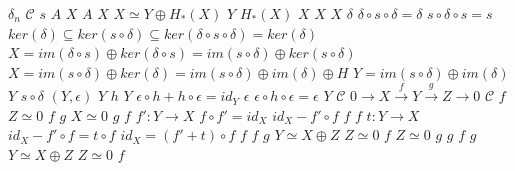 \documentclass{article}
\begin{document}
$\delta_n$
$\mathcal{C}$
$s$
$A$
$X$
$A$
$X$
$X \simeq Y \oplus H_*(X)$
$Y$
$H_*(X)$
$X$
$X$
$X$
$\delta$
$\delta \circ s \circ \delta=\delta$
$s \circ \delta \circ s=s$
$ker(\delta) \subseteq ker(s \circ \delta) \subseteq ker(\delta \circ s \circ \delta) =ker(\delta)$
$X=im(\delta \circ s) \oplus ker(\delta \circ s)=im(s \circ \delta) \oplus ker(s \circ \delta)$
$X=im(s \circ \delta) \oplus ker(\delta)=im(s \circ \delta) \oplus im(\delta) \oplus H$
$Y=im(s \circ \delta) \oplus im(\delta)$
$Y$
$s \circ \delta$
$(Y,\epsilon)$
$Y$
$h$
$Y$
$\epsilon \circ h+h \circ \epsilon =id_Y$
$\epsilon$
$\epsilon \circ h \circ \epsilon=\epsilon$
$Y$
$\mathcal{C}$
$0 \longrightarrow X \stackrel{f}{\longrightarrow} Y \stackrel{g}{\longrightarrow} Z \longrightarrow 0$
$\mathcal{C}$
$f$
$Z \simeq 0$
$f$
$g$
$X \simeq 0$
$g$
$f$
$f':Y \rightarrow X$
$f \circ f'=id_X$
$id_X-f'\circ f$
$f$
$f$
$t:Y \rightarrow X$
$id_X-f' \circ f=t \circ f$
$id_X=(f'+t)\circ f$
$f$
$f$
$g$
$Y \simeq X \oplus Z$
$Z \simeq 0$
$f$
$Z \simeq 0$
$g$
$g$
$f$
$g$
$Y\simeq X \oplus Z$
$Z \simeq 0$
$f$
\end{document}
